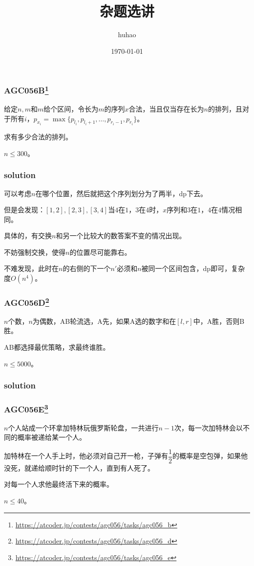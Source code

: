\documentclass[10pt]{beamer}
\begin{document}
	\title{杂题选讲}
	\date{\today}
	\author{huhao}
	\maketitle
	\clearpage
	\begin{frame}
		\frametitle{AGC056B\footnote{\url{https://atcoder.jp/contests/agc056/tasks/agc056_b}}}
	
		给定$n,m$和$m$给个区间，令长为$m$的序列$x$合法，当且仅当存在长为$n$的排列，且对于所有$i$，$p_{x_i}=\max\{p_{l_i},p_{l_i+1},\dots,p_{r_i-1},p_{r_i}\}$。

		求有多少合法的排列。

		$n\le 300$。
	
	\end{frame}
	\clearpage
	\begin{frame}
		\frametitle{solution}
	
		可以考虑$n$在哪个位置，然后就把这个序列划分为了两半，dp下去。

		但是会发现：$[1,2],[2,3],[3,4]$当$4$在$1$，$3$在$4$时，$x$序列和$3$在$1$，$4$在$4$情况相同。

		具体的，有交换$n$和另一个比较大的数答案不变的情况出现。

		不妨强制交换，使得$n$的位置尽可能靠右。

		不难发现，此时在$n$的右侧的下一个$n'$必须和$n$被同一个区间包含，dp即可，复杂度$O(n^4)$。
	
	\end{frame}
	\clearpage
	\begin{frame}
		\frametitle{AGC056D\footnote{\url{https://atcoder.jp/contests/agc056/tasks/agc056_d}}}

		$n$个数，$n$为偶数，AB轮流选，A先，如果A选的数字和在$[l,r]$中，A胜，否则B胜。

		AB都选择最优策略，求最终谁胜。

		$n\le 5000$。

	\end{frame}
	\clearpage
	\begin{frame}
		\frametitle{solution}
	
	\end{frame}
	\clearpage
	\begin{frame}
		\frametitle{AGC056E\footnote{\url{https://atcoder.jp/contests/agc056/tasks/agc056_e}}}
	
		$n$个人站成一个环拿加特林玩俄罗斯轮盘，一共进行$n-1$次，每一次加特林会以不同的概率被递给某一个人。

		加特林在一个人手上时，他必须对自己开一枪，子弹有$\dfrac 12$的概率是空包弹，如果他没死，就递给顺时针的下一个人，直到有人死了。

		对每一个人求他最终活下来的概率。

		$n\le 40$。
	
	\end{frame}
\end{document}
